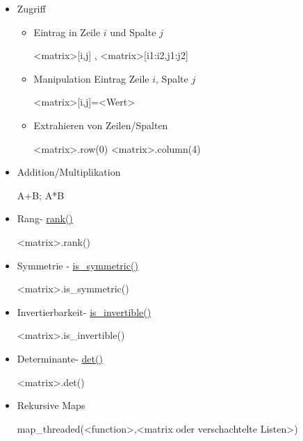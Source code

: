 \documentclass[a4paper,9pt,DIV15,twocolumn]{scrartcl}
\begin{document}
\begin{itemize}
\item Zugriff
\begin{itemize}
 \item Eintrag in Zeile $i$ und Spalte $j$
\begin{sagein}
<matrix>[i,j] , <matrix>[i1:i2,j1:j2]
\end{sagein}
\item Manipulation Eintrag Zeile $i$, Spalte $j$
\begin{sagein}
<matrix>[i,j]=<Wert>
\end{sagein}
\item Extrahieren von Zeilen/Spalten
\begin{sagein}
<matrix>.row(0)
<matrix>.column(4)
\end{sagein}
\end{itemize}
\item Addition/Multiplikation
\begin{sagein}
A+B; A*B
\end{sagein}
\item Rang- \href{https://sage.math.uni-goettingen.de/doc/static/reference/sage/matrix/matrix0.html?highlight=matrix.rank#sage.matrix.matrix0.Matrix.rank}{rank()}
\begin{sagein}
<matrix>.rank()        
\end{sagein}
\item Symmetrie - \href{https://sage.math.uni-goettingen.de/doc/static/reference/sage/matrix/matrix0.html?highlight=matrix.rank#sage.matrix.matrix0.Matrix.is_symmetric}{is\_symmetric()}
\begin{sagein}
<matrix>.is_symmetric() 
\end{sagein}
\item Invertierbarkeit- \href{https://sage.math.uni-goettingen.de/doc/static/reference/sage/matrix/matrix0.html?highlight=matrix.rank#sage.matrix.matrix0.Matrix.is_invertible}{is\_invertible()}
    \begin{sagein}
<matrix>.is_invertible()
    \end{sagein}
\item Determinante- \href{https://sage.math.uni-goettingen.de/doc/static/reference/sage/matrix/matrix2.html?highlight=matrix.det#sage.matrix.matrix2.Matrix.det}{det()}
\begin{sagein}
<matrix>.det()
\end{sagein}
\item Rekursive Maps
\begin{sagein}
map_threaded(<function>,<matrix oder verschachtelte Listen>)
\end{sagein}
\end{itemize}
\end{document}
